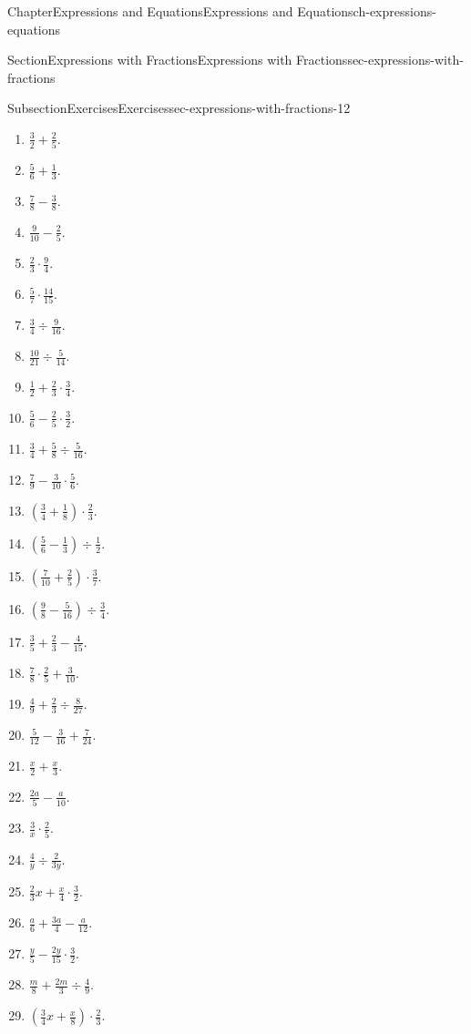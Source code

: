 \documentclass[twoside,11pt,]{book}
\numberwithin{equation}{chapter}
\begin{document}
\begin{chapterptx}{Chapter}{Expressions and Equations}{}{Expressions and Equations}{}{}{ch-expressions-equations}
\begin{sectionptx}{Section}{Expressions with Fractions}{}{Expressions with Fractions}{}{}{sec-expressions-with-fractions}
\begin{subsectionptx}{Subsection}{Exercises}{}{Exercises}{}{}{sec-expressions-with-fractions-12}
\begin{enumerate}
\begin{enumerate}
\item{}\(\frac{3}{2} + \frac{2}{5}\).%
\item{}\(\frac{5}{6} + \frac{1}{3}\).%
\item{}\(\frac{7}{8} - \frac{3}{8}\).%
\item{}\(\frac{9}{10} - \frac{2}{5}\).%
\item{}\(\frac{2}{3} \cdot \frac{9}{4}\).%
\item{}\(\frac{5}{7} \cdot \frac{14}{15}\).%
\item{}\(\frac{3}{4} \div \frac{9}{16}\).%
\item{}\(\frac{10}{21} \div \frac{5}{14}\).%
\item{}\(\frac{1}{2} + \frac{2}{3} \cdot \frac{3}{4}\).%
\item{}\(\frac{5}{6} - \frac{2}{5} \cdot \frac{3}{2}\).%
\item{}\(\frac{3}{4} + \frac{5}{8} \div \frac{5}{16}\).%
\item{}\(\frac{7}{9} - \frac{3}{10} \cdot \frac{5}{6}\).%
\item{}\((\frac{3}{4} + \frac{1}{8}) \cdot \frac{2}{3}\).%
\item{}\((\frac{5}{6} - \frac{1}{3}) \div \frac{1}{2}\).%
\item{}\((\frac{7}{10} + \frac{2}{5}) \cdot \frac{3}{7}\).%
\item{}\((\frac{9}{8} - \frac{5}{16}) \div \frac{3}{4}\).%
\item{}\(\frac{3}{5} + \frac{2}{3} - \frac{4}{15}\).%
\item{}\(\frac{7}{8} \cdot \frac{2}{5} + \frac{3}{10}\).%
\item{}\(\frac{4}{9} + \frac{2}{3} \div \frac{8}{27}\).%
\item{}\(\frac{5}{12} - \frac{3}{16} + \frac{7}{24}\).%
\item{}\(\frac{x}{2} + \frac{x}{3}\).%
\item{}\(\frac{2a}{5} - \frac{a}{10}\).%
\item{}\(\frac{3}{x} \cdot \frac{2}{5}\).%
\item{}\(\frac{4}{y} \div \frac{2}{3y}\).%
\item{}\(\frac{2}{3}x + \frac{x}{4} \cdot \frac{3}{2}\).%
\item{}\(\frac{a}{6} + \frac{3a}{4} - \frac{a}{12}\).%
\item{}\(\frac{y}{5} - \frac{2y}{15} \cdot \frac{3}{2}\).%
\item{}\(\frac{m}{8} + \frac{2m}{3} \div \frac{4}{9}\).%
\item{}\((\frac{3}{4}x + \frac{x}{8}) \cdot \frac{2}{3}\).%

\end{enumerate}
\end{enumerate}
\end{subsectionptx}
\end{sectionptx}
\end{chapterptx}
\end{document}
